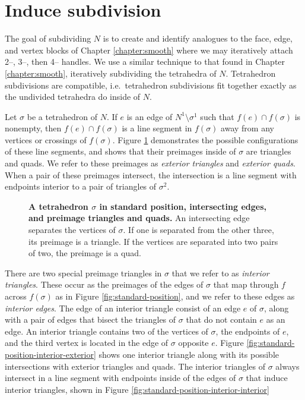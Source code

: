 \section{Induce subdivision}

The goal of subdividing $N$ is to create and identify analogues to the face, edge, and vertex blocks of Chapter \ref{chapter:smooth} where we may iteratively attach 2--, 3--, then 4-- handles.
We use a similar technique to that found in Chapter \ref{chapter:smooth}, iteratively subdividing the tetrahedra of $N$.
Tetrahedron subdivisions are compatible, i.e.\ tetrahedron subdivisions fit together exactly as the undivided tetrahedra do inside of $N$.

Let $\sigma$ be a tetrahedron of $N$.
If $e$ is an edge of $N^1\setminus\sigma^1$ such that $f(e)\cap f(\sigma)$ is nonempty, then $f(e)\cap f(\sigma)$ is a line segment in $f(\sigma)$ away from any vertices or crossings of $f(\sigma)$.
Figure \ref{fig:standard-position-intersection} demonstrates the possible configurations of these line segments, and shows that their preimages inside of $\sigma$ are triangles and quads.
We refer to these preimages as \emph{exterior triangles} and \emph{exterior quads}.
When a pair of these preimages intersect, the intersection is a line segment with endpoints interior to a pair of triangles of $\sigma^2$.

\begin{figure}[h!]
	\caption{
		\textbf{A tetrahedron $\sigma$ in standard position, intersecting edges, and preimage triangles and quads.}
		An intersecting edge separates the vertices of $\sigma$.
		If one is separated from the other three, its preimage is a triangle.
		If the vertices are separated into two pairs of two, the preimage is a quad.
	}
	\label{fig:standard-position-intersection}
\end{figure}

There are two special preimage triangles in $\sigma$ that we refer to as \emph{interior triangles}.
These occur as the preimages of the edges of $\sigma$ that map through $f$ across $f(\sigma)$ as in Figure \ref{fig:standard-position}, and we refer to these edges as \emph{interior edges}.
The edge of an interior triangle consist of an edge $e$ of $\sigma$, along with a pair of edges that bisect the triangles of $\sigma$ that do not contain $e$ as an edge.
An interior triangle contains two of the vertices of $\sigma$, the endpoints of $e$, and the third vertex is located in the edge of $\sigma$ opposite $e$.
Figure \ref{fig:standard-position-interior-exterior} shows one interior triangle along with its possible intersections with exterior triangles and quads.
The interior triangles of $\sigma$ always intersect in a line segment with endpoints inside of the edges of $\sigma$ that induce interior triangles, shown in Figure \ref{fig:standard-position-interior-interior}

